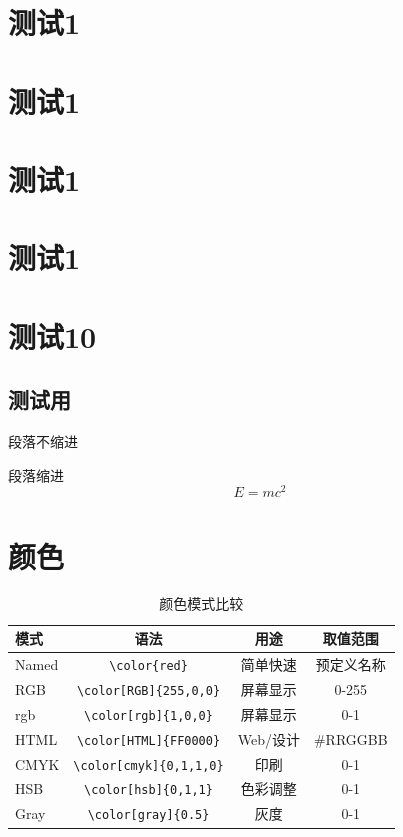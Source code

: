 \documentclass{ctexart}
\begin{document}
\section{测试1}\section{测试1}\section{测试1}\section{测试1}\section{测试10}
\subsection{测试用}
\noindent 段落不缩进
\par
段落缩进
\[
    E = m c^2
\]


\newpage
\appendix %
\section{颜色}
\begin{table}[htbp]
    \centering
    \caption{颜色模式比较}
    \begin{tabular}{l|ccc}
        \toprule
        模式 & 语法 & 用途 & 取值范围 \\
        \midrule
        Named & \verb|\color{red}| & 简单快速 & 预定义名称 \\
        RGB & \verb|\color[RGB]{255,0,0}| & 屏幕显示 & 0-255 \\
        rgb & \verb|\color[rgb]{1,0,0}| & 屏幕显示 & 0-1 \\
        HTML & \verb|\color[HTML]{FF0000}| & Web/设计 & \#RRGGBB \\
        CMYK & \verb|\color[cmyk]{0,1,1,0}| & 印刷 & 0-1 \\
        HSB & \verb|\color[hsb]{0,1,1}| & 色彩调整 & 0-1 \\
        Gray & \verb|\color[gray]{0.5}| & 灰度 & 0-1 \\
        \bottomrule
    \end{tabular}
\end{table}
\end{document}
